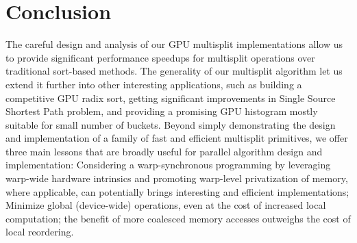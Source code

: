\section{Conclusion}\label{sec:conclusion}
The careful design and analysis of our GPU multisplit implementations allow us to provide significant performance speedups for multisplit operations over traditional sort-based methods. 
The generality of our multisplit algorithm let us extend it further into other interesting applications, such as building a competitive GPU radix sort, getting significant improvements in Single Source Shortest Path problem, and providing a promising GPU histogram mostly suitable for small number of buckets. 
Beyond simply demonstrating the design and implementation of a family of fast and efficient multisplit primitives, we offer three main lessons that are broadly useful for parallel algorithm design and implementation:
Considering a warp-synchronous programming by leveraging warp-wide hardware intrinsics and promoting warp-level privatization of memory, where applicable, can potentially brings interesting and efficient implementations;    
Minimize global (device-wide) operations, even at the cost of increased local computation; the benefit of more coalesced memory accesses outweighs the cost of local reordering.
